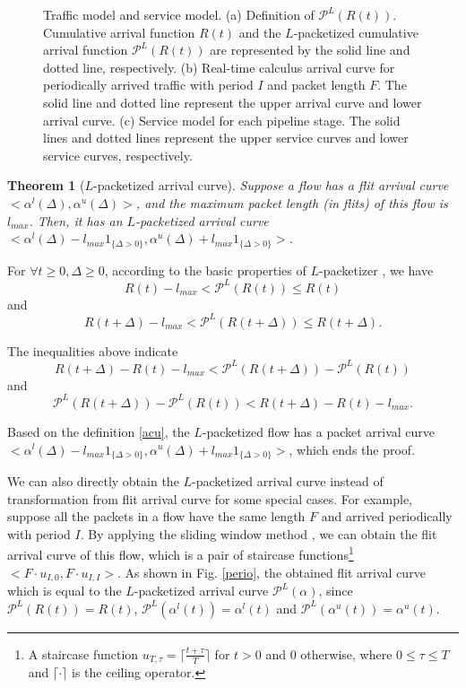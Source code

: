 \documentclass[preprint]{elsarticle}
\newtheorem{thm}{Theorem}
\begin{document}
\begin{figure}
  \caption{Traffic model and service model. (a) Definition of $\mathcal{P}^L(R(t))$. Cumulative arrival function $R(t)$ and the $L$-packetized cumulative arrival function $\mathcal{P}^L(R(t))$ are represented by the solid line and dotted line, respectively. (b) Real-time calculus arrival curve for periodically arrived traffic with period $I$ and packet length $F$. The solid line and dotted line represent the upper arrival curve and lower arrival curve. (c) Service model for each pipeline stage. The solid lines and dotted lines represent the upper service curves and lower service curves, respectively.}\label{ac}
\end{figure}
\begin{thm}[$L$-packetized arrival curve]\label{pktac}
Suppose a flow has a flit arrival curve $<\alpha^l(\Delta),\alpha^u(\Delta)>$, and the maximum packet length (in flits) of this flow is $l_{max}$. Then, it has an $L$-packetized arrival curve $<\alpha^l(\Delta)-l_{max}1_{\{\Delta>0\}},\alpha^u(\Delta)+l_{max}1_{\{\Delta>0\}}>$.
\end{thm}
\begin{pf}
For $\forall t\geq 0,\Delta\geq 0$, according to the basic properties of $L$-packetizer \cite{Boudec2001Network}, we have
$$R(t)-l_{max}< \mathcal{P}^L(R(t))\leq R(t)$$
and
$$R(t+\Delta)-l_{max}< \mathcal{P}^L(R(t+\Delta))\leq R(t+\Delta).$$

The inequalities above indicate
$$R(t+\Delta)-R(t)-l_{max}< \mathcal{P}^L(R(t+\Delta))-\mathcal{P}^L(R(t))$$
and
$$\mathcal{P}^L(R(t+\Delta))-\mathcal{P}^L(R(t))< R(t+\Delta)-R(t)-l_{max}.$$

Based on the definition \ref{acu}, the $L$-packetized flow has a packet arrival curve $<\alpha^l(\Delta)-l_{max}1_{\{\Delta>0\}},\alpha^u(\Delta)+l_{max}1_{\{\Delta>0\}}>$, which ends the proof.
\end{pf}

We can also directly obtain the $L$-packetized arrival curve instead of transformation from flit arrival curve for some special cases. For example, suppose all the packets in a flow have the same length $F$ and arrived periodically with period $I$. By applying the sliding window method \cite{1253607}, we can obtain the flit arrival curve of this flow, which is a pair of staircase functions\footnote{A staircase function $u_{T,\tau}=\lceil\frac{t+\tau}{T}\rceil$ for $t>0$ and 0 otherwise, where $0\leq \tau\leq T$ and $\lceil\cdot\rceil$ is the ceiling operator.} $<F\cdot u_{I,0},F\cdot u_{I,I}>$. As shown in Fig. \ref{perio}, the obtained flit arrival curve which is equal to the $L$-packetized arrival curve $\mathcal{P}^L(\alpha)$, since $\mathcal{P}^L(R(t))=R(t)$, $\mathcal{P}^L(\alpha^l(t))=\alpha^l(t)$ and $\mathcal{P}^L(\alpha^u(t))=\alpha^u(t)$.
\end{document}
